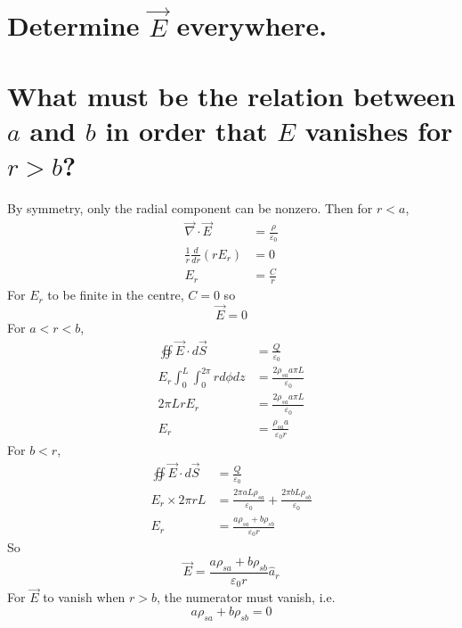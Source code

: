 \documentclass[answers]{exam}
\begin{document}
\begin{questions}

\begin{parts}
	\part{Determine $\vec{E}$ everywhere.}
	\part{What must be the relation between $a$ and $b$ in order that $E$ vanishes for $r>b$?}
\end{parts}

\begin{solution}
	By symmetry, only the radial component can be nonzero. Then for $r<a$,
	\begin{align*}
		\vec{\nabla}\cdot\vec{E} &= \frac{\rho}{\varepsilon_0} \\
		\frac{1}{r}\frac{d}{dr}(rE_r) &= 0 \\
		E_r &= \frac{C}{r}
	\end{align*}
	For $E_r$ to be finite in the centre, $C=0$ so
	$$\vec{E} = 0$$
	For $a<r<b$,
	\begin{align*}
		\oiint \vec{E}\cdot d\vec{S} &= \frac{Q}{\varepsilon_0} \\
		E_r\int_0^L \int_0^{2\pi} rd\phi dz &= \frac{2\rho_{sa}a\pi L}{\varepsilon_0} \\
		2\pi LrE_r &= \frac{2\rho_{sa}a\pi L}{\varepsilon_0} \\
		E_r &= \frac{\rho_{sa}a}{\varepsilon_0r}
	\end{align*}
	For $b<r$,
	\begin{align*}
		\oiint\vec{E}\cdot d\vec{S} &= \frac{Q}{\varepsilon_0} \\
		E_r\times2\pi rL &= \frac{2\pi aL\rho_{sa}}{\varepsilon_0} + \frac{2\pi bL\rho_{sb}}{\varepsilon_0} \\
		E_r &= \frac{a\rho_{sa} + b\rho_{sb}}{\varepsilon_0r}
	\end{align*}
	So
	$$\vec{E} = \frac{a\rho_{sa} + b\rho_{sb}}{\varepsilon_0r}\hat{a}_r$$
	For $\vec{E}$ to vanish when $r>b$, the numerator must vanish, i.e.
	$$a\rho_{sa} + b\rho_{sb} = 0$$
\end{solution}



\end{questions}
\end{document}
